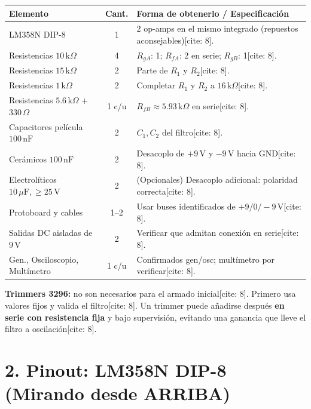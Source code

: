 \documentclass[11pt, a4paper]{article}
\begin{document}
\begin{center}
\begin{tabularx}{\textwidth}{@{} l c L @{}}
\toprule
\textbf{Elemento} & \textbf{Cant.} & \textbf{Forma de obtenerlo / Especificación} \\ \midrule
LM358N DIP-8 & 1 & 2 op-amps en el mismo integrado (repuestos aconsejables)[cite: 8]. \\ \addlinespace[4pt]
Resistencias $10\,\text{k}\Omega$ & 4 & $R_{gA}$: 1; $R_{fA}$: 2 en serie; $R_{gB}$: 1[cite: 8]. \\ \addlinespace[4pt]
Resistencias $15\,\text{k}\Omega$ & 2 & Parte de $R_1$ y $R_2$[cite: 8]. \\ \addlinespace[4pt]
Resistencias $1\,\text{k}\Omega$ & 2 & Completar $R_1$ y $R_2$ a $16\,\text{k}\Omega$[cite: 8]. \\ \addlinespace[4pt]
Resistencias $5.6\,\text{k}\Omega$ + $330\,\Omega$ & 1 c/u & $R_{fB} \approx 5.93\,\text{k}\Omega$ en serie[cite: 8]. \\ \addlinespace[4pt]
Capacitores película $100\,\text{nF}$ & 2 & $C_1, C_2$ del filtro[cite: 8]. \\ \addlinespace[4pt]
Cerámicos $100\,\text{nF}$ & 2 & Desacoplo de $+9\,\text{V}$ y $-9\,\text{V}$ hacia GND[cite: 8]. \\ \addlinespace[4pt]
Electrolíticos $10\,\mu\text{F}, \ge 25\,\text{V}$ & 2 & (Opcionales) Desacoplo adicional: polaridad correcta[cite: 8]. \\ \addlinespace[4pt]
Protoboard y cables & 1--2 & Usar buses identificados de $+9 / 0 / -9\,\text{V}$[cite: 8]. \\ \addlinespace[4pt]
Salidas DC aisladas de $9\,\text{V}$ & 2 & Verificar que admitan conexión en serie[cite: 8]. \\ \addlinespace[4pt]
Gen., Osciloscopio, Multímetro & 1 c/u & Confirmados gen/osc; multímetro por verificar[cite: 8]. \\ \bottomrule
\end{tabularx}
\end{center}

\textbf{Trimmers 3296:} no son necesarios para el armado inicial[cite: 8]. Primero usa valores fijos y valida el filtro[cite: 8]. Un trimmer puede añadirse después \textbf{en serie con resistencia fija} y bajo supervisión, evitando una ganancia que lleve el filtro a oscilación[cite: 8].

\newpage
\section{2. Pinout: LM358N DIP-8 (Mirando desde ARRIBA)}
\end{document}

